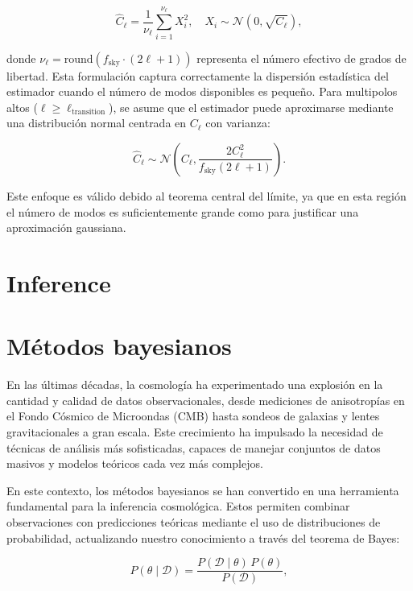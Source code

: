 \documentclass[11pt]{article}
\begin{document}
\begin{equation}
\hat{C}_\ell = \frac{1}{\nu_\ell} \sum_{i=1}^{\nu_\ell} X_i^2, \quad X_i \sim \mathcal{N}(0, \sqrt{C_\ell}),
\end{equation}

donde \(\nu_\ell = \text{round}(f_{\text{sky}} \cdot (2\ell + 1))\) representa el número efectivo de grados de libertad. Esta formulación captura correctamente la dispersión estadística del estimador cuando el número de modos disponibles es pequeño. Para multipolos altos (\(\ell \geq \ell_{\text{transition}}\)), se asume que el estimador puede aproximarse mediante una distribución normal centrada en \(C_\ell\) con varianza:

\begin{equation}
\hat{C}_\ell \sim \mathcal{N}\left(C_\ell, \frac{2 C_\ell^2}{f_{\text{sky}} (2\ell + 1)} \right).
\end{equation}

Este enfoque es válido debido al teorema central del límite, ya que en esta región el número de modos es suficientemente grande como para justificar una aproximación gaussiana.

\section{Inference}

\newpage
\section{Métodos bayesianos}
En las últimas décadas, la cosmología ha experimentado una explosión en la cantidad y calidad de datos observacionales, desde mediciones de anisotropías en el Fondo Cósmico de Microondas (CMB) hasta sondeos de galaxias y lentes gravitacionales a gran escala. Este crecimiento ha impulsado la necesidad de técnicas de análisis más sofisticadas, capaces de manejar conjuntos de datos masivos y modelos teóricos cada vez más complejos.  

En este contexto, los métodos bayesianos se han convertido en una herramienta fundamental para la inferencia cosmológica. Estos permiten combinar observaciones con predicciones teóricas mediante el uso de distribuciones de probabilidad, actualizando nuestro conocimiento a través del teorema de Bayes:  

\begin{equation}  
    P(\theta \mid \mathcal{D}) = \frac{P(\mathcal{D} \mid \theta) \, P(\theta)}{P(\mathcal{D})},  
\end{equation}  
\end{document}
